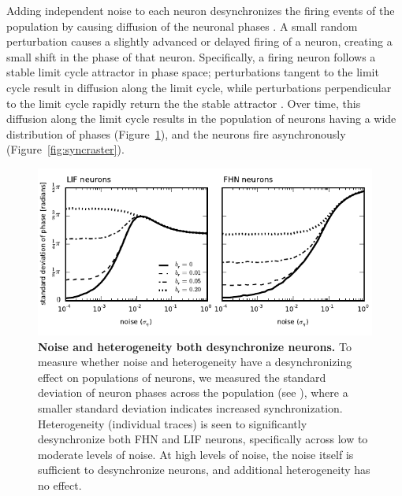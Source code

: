 \documentclass[12pt]{article}
\begin{document}
Adding independent noise to each neuron desynchronizes the firing events of the population by causing diffusion of the neuronal phases \citep{Stocks2001a}. A small random perturbation causes a slightly advanced or delayed firing of a neuron, creating a small shift in the phase of that neuron. Specifically, a firing neuron follows a stable limit cycle attractor in phase space; perturbations tangent to the limit cycle result in diffusion along the limit cycle, while perturbations perpendicular to the limit cycle rapidly return the the stable attractor \citep{Tomita1974}. Over time, this diffusion along the limit cycle results in the population of neurons having a wide distribution of phases (Figure~\ref{fig:phase}), and the neurons fire asynchronously (Figure~\ref{fig:syncraster}).

\begin{figure}
  \ifx\hidefigures\undefined
    \centering
    \includegraphics[width=\textwidth]{figure5_phase.pdf}
  \fi
  \caption{
    \textbf{Noise and heterogeneity both desynchronize neurons.} To measure whether noise and heterogeneity have a desynchronizing effect on populations of neurons, we measured the standard deviation of neuron phases across the population (see \textsc{}), where a smaller standard deviation indicates increased synchronization. Heterogeneity (individual traces) is seen to significantly desynchronize both FHN and LIF neurons, specifically across low to moderate levels of noise. At high levels of noise, the noise itself is sufficient to desynchronize neurons, and additional heterogeneity has no effect.
  }
  \label{fig:phase}
\end{figure}
\end{document}
